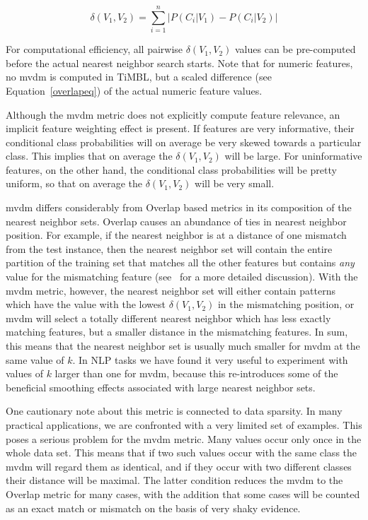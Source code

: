 \documentclass{report}
\begin{document}
\begin{equation}
\delta(V_{1}, V_{2}) = \sum_{i=1}^{n} \left| P(C_{i}|V_{1}) - P(C_{i}|V_{2})
\right|
\label{MVDMeq}
\end{equation}

For computational efficiency, all pairwise $\delta(V_{1}, V_{2})$
values can be pre-comput\-ed before the actual nearest neighbor search
starts. Note that for numeric features, no {\sc mvdm} is computed in
TiMBL, but a scaled difference (see Equation~\ref{overlapeq}) of the
actual numeric feature values.

Although the {\sc mvdm} metric does not explicitly compute feature
relevance, an implicit feature weighting effect is present. If
features are very informative, their conditional class probabilities
will on average be very skewed towards a particular class. This
implies that on average the $\delta(V_{1}, V_{2})$ will be large. For
uninformative features, on the other hand, the conditional class
probabilities will be pretty uniform, so that on average the
$\delta(V_{1}, V_{2})$ will be very small.

{\sc mvdm} differs considerably from Overlap based metrics in its
composition of the nearest neighbor sets. Overlap causes an abundance
of ties in nearest neighbor position. For example, if the nearest
neighbor is at a distance of one mismatch from the test instance, then
the nearest neighbor set will contain the entire partition of the
training set that matches all the other features but contains {\em
any} value for the mismatching feature (see~\cite{Zavrel+97} for a
more detailed discussion). With the {\sc mvdm} metric, however, the
nearest neighbor set will either contain patterns which have the value
with the lowest $\delta(V_{1}, V_{2})$ in the mismatching position, or
{\sc mvdm} will select a totally different nearest neighbor which has
less exactly matching features, but a smaller distance in the
mismatching features. In sum, this
means that the nearest neighbor set is usually much smaller for {\sc
mvdm} at the same value of $k$. In NLP tasks we have found it very
useful to experiment with values of $k$ larger than one for {\sc
mvdm}, because this re-introduces some of the beneficial smoothing
effects associated with large nearest neighbor sets.

One cautionary note about this metric is connected to data
sparsity. In many practical applications, we are confronted with a
very limited set of examples. This poses a serious problem for the
{\sc mvdm} metric. Many values occur only once in the whole data
set. This means that if two such values occur with the same class the
{\sc mvdm} will regard them as identical, and if they occur with two
different classes their distance will be maximal. The latter condition
reduces the {\sc mvdm} to the Overlap metric for many cases, with the
addition that some cases will be counted as an exact match or mismatch
on the basis of very shaky evidence.
\end{document}
